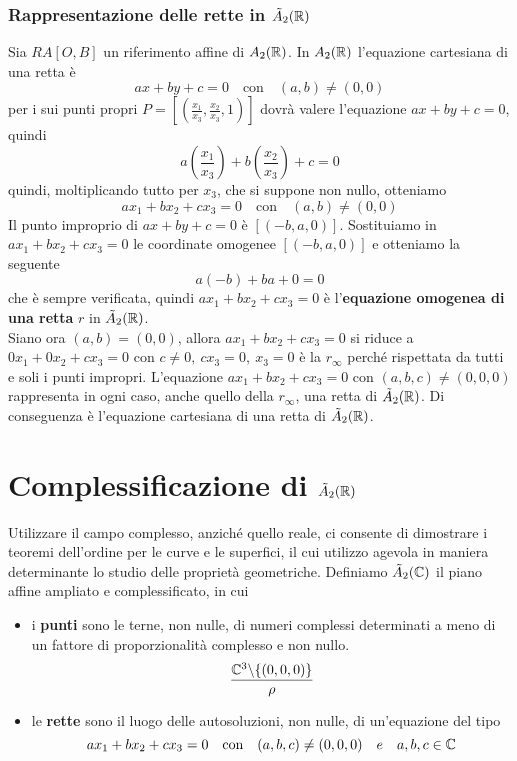\subsubsection{Rappresentazione delle rette in \(\tilde{A}_{2}(\RR) \)}
Sia \(RA [O, B]\) un riferimento affine di \(A_{2}(\RR) \). In \(A_{2}(\RR) \) l'equazione cartesiana di una retta è 
\[ax+by+c = 0 \quad \text{con} \quad  (a,b) \neq (0,0)\]
per i sui punti propri \(P = \left[ \left( \frac{x_1}{x_3}, \frac{x_2}{x_3}, 1 \right)  \right] \) dovrà valere l'equazione \(ax+by+c = 0\), quindi \[
a \left( \frac{x_1}{x_3} \right) + b \left( \frac{x_2}{x_3} \right) + c = 0 \]
quindi, moltiplicando tutto per \(x_3\), che si suppone non nullo, otteniamo
\[ ax_1+ bx_2+ cx_3=0 \quad \text{con}\quad (a,b) \neq (0,0)
\] Il punto improprio di \(ax+by+c=0\) è \([(-b, a, 0)]\). Sostituiamo in \(ax_1+ bx_2+ cx_3=0\) le coordinate omogenee \([(-b, a, 0)]\) e otteniamo la seguente \[
a(-b) + b a + 0 = 0
\] che è sempre verificata, quindi \(ax_1+ bx_2+ cx_3=0\) è l'\textbf{equazione omogenea di una retta} \(r\) in \(\tilde{A}_{2}(\RR) \). \\
Siano ora \((a,b) = (0,0)\), allora \(ax_1+ bx_2+ cx_3=0\) si riduce a \(0 x_1+0x_2+cx_3=0\) con \(c \neq 0, \ cx_3 = 0, \ x_3 = 0\) è la \(r_{\infty}\) perché rispettata da tutti e soli i punti impropri. 
L'equazione \(ax_1+bx_2+cx_3= 0\) con \((a,b,c) \neq (0,0,0)\) rappresenta in ogni caso, anche quello della \(r_\infty\), una retta di \(\tilde{A}_{2}(\RR) \). Di conseguenza è l'equazione cartesiana di una retta di \(\tilde{A}_{2}(\RR)\).

\section{Complessificazione di \(\tilde{A}_{2}(\RR) \)}

Utilizzare il campo complesso, anziché quello reale, ci consente di dimostrare i teoremi dell'ordine per le curve e le superfici, il cui utilizzo agevola in maniera determinante lo studio delle proprietà geometriche. Definiamo \(\tilde{A}_{2}(\CC) \) il piano affine ampliato e complessificato, in cui
\begin{itemize}
    \item i \textbf{punti} sono le terne, non nulle, di numeri complessi determinati a meno di un fattore di proporzionalità complesso e non nullo.
\[
\frac{\CC^{3}\backslash \{(0,0,0)\} }{\rho }
\] 
    \item le \textbf{rette} sono il luogo delle autosoluzioni, non nulle, di un'equazione del tipo \[
    ax_1+bx_2+cx_3= 0 \quad \text{con} \quad (a,b,c) \neq (0,0,0) \quad e \quad a,b,c \in \CC
    \] 
\end{itemize}

